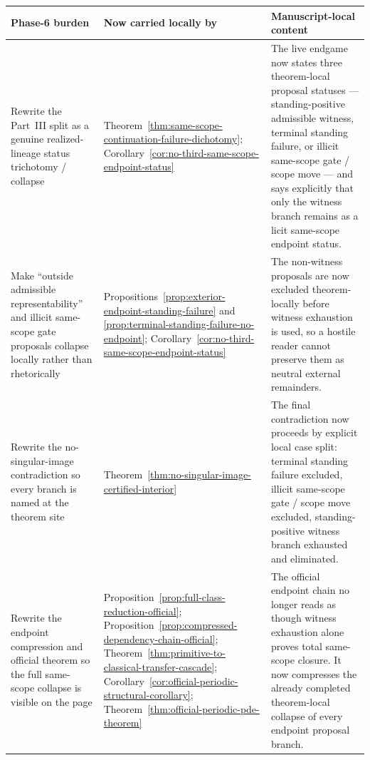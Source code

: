\begin{center}
\footnotesize
\renewcommand{\arraystretch}{1.16}
\setlength{\tabcolsep}{4pt}
\begin{tabularx}{0.98\textwidth}{@{}L{0.31\textwidth}L{0.24\textwidth}Y@{}}
\toprule
\textbf{Phase-6 burden} & \textbf{Now carried locally by} & \textbf{Manuscript-local content}\\
\midrule
Rewrite the Part~III split as a genuine realized-lineage status trichotomy / collapse & Theorem~\ref{thm:same-scope-continuation-failure-dichotomy}; Corollary~\ref{cor:no-third-same-scope-endpoint-status} & The live endgame now states three theorem-local proposal statuses --- standing-positive admissible witness, terminal standing failure, or illicit same-scope gate / scope move --- and says explicitly that only the witness branch remains as a licit same-scope endpoint status.\\
Make ``outside admissible representability'' and illicit same-scope gate proposals collapse locally rather than rhetorically & Propositions~\ref{prop:exterior-endpoint-standing-failure} and \ref{prop:terminal-standing-failure-no-endpoint}; Corollary~\ref{cor:no-third-same-scope-endpoint-status} & The non-witness proposals are now excluded theorem-locally before witness exhaustion is used, so a hostile reader cannot preserve them as neutral external remainders.\\
Rewrite the no-singular-image contradiction so every branch is named at the theorem site & Theorem~\ref{thm:no-singular-image-certified-interior} & The final contradiction now proceeds by explicit local case split: terminal standing failure excluded, illicit same-scope gate / scope move excluded, standing-positive witness branch exhausted and eliminated.\\
Rewrite the endpoint compression and official theorem so the full same-scope collapse is visible on the page & Proposition~\ref{prop:full-class-reduction-official}; Proposition~\ref{prop:compressed-dependency-chain-official}; Theorem~\ref{thm:primitive-to-classical-transfer-cascade}; Corollary~\ref{cor:official-periodic-structural-corollary}; Theorem~\ref{thm:official-periodic-pde-theorem} & The official endpoint chain no longer reads as though witness exhaustion alone proves total same-scope closure. It now compresses the already completed theorem-local collapse of every endpoint proposal branch.\\
\bottomrule
\end{tabularx}
\end{center}

